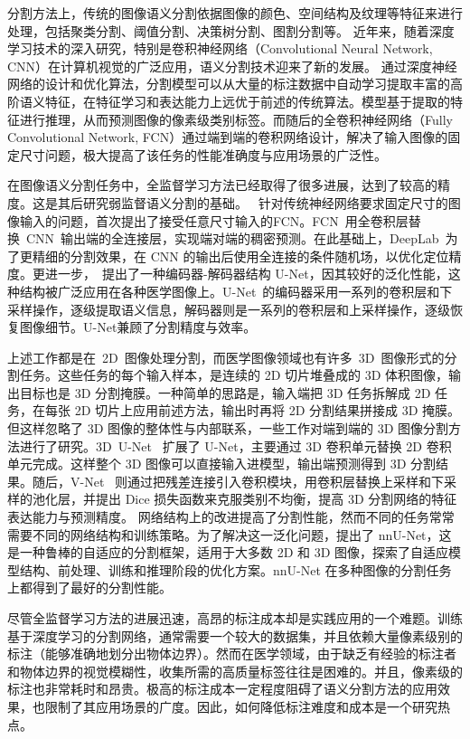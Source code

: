 分割方法上，传统的图像语义分割依据图像的颜色、空间结构及纹理等特征来进行处理，包括聚类分割\citep{coates2012learning}、阈值分割\citep{ying2005fast}、决策树分割\citep{shotton2008semantic}、图割分割\citep{vicente2008graph}等。
近年来，随着深度学习技术的深入研究，特别是卷积神经网络（Convolutional Neural Network, CNN）在计算机视觉的广泛应用，语义分割技术迎来了新的发展。
通过深度神经网络的设计和优化算法，分割模型可以从大量的标注数据中自动学习提取丰富的高阶语义特征，在特征学习和表达能力上远优于前述的传统算法。模型基于提取的特征进行推理，从而预测图像的像素级类别标签。而随后的全卷积神经网络（Fully Convolutional Network, FCN）通过端到端的卷积网络设计，解决了输入图像的固定尺寸问题，极大提高了该任务的性能准确度与应用场景的广泛性。%

在图像语义分割任务中，全监督学习方法已经取得了很多进展，达到了较高的精度。这是其后研究弱监督语义分割的基础。
\citet{long2015fully}~针对传统神经网络要求固定尺寸的图像输入的问题，首次提出了接受任意尺寸输入的FCN。FCN~用全卷积层替换~CNN~输出端的全连接层，实现端对端的稠密预测。在此基础上，DeepLab~为了更精细的分割效果，在 CNN 的输出后使用全连接的条件随机场，以优化定位精度。更进一步，\citet{ronneberger2015u}~提出了一种编码器-解码器结构 U-Net，因其较好的泛化性能，这种结构被广泛应用在各种医学图像上。U-Net~的编码器采用一系列的卷积层和下采样操作，逐级提取语义信息，解码器则是一系列的卷积层和上采样操作，逐级恢复图像细节。U-Net兼顾了分割精度与效率。

上述工作都是在~2D~图像处理分割，而医学图像领域也有许多~3D~图像形式的分割任务。这些任务的每个输入样本，是连续的 2D 切片堆叠成的 3D 体积图像，输出目标也是 3D 分割掩膜。一种简单的思路是，输入端把 3D 任务拆解成 2D 任务，在每张 2D 切片上应用前述方法，输出时再将 2D 分割结果拼接成 3D 掩膜。但这样忽略了 3D 图像的整体性与内部联系，一些工作对端到端的 3D 图像分割方法进行了研究。3D~U-Net~\citep{cciccek20163d} 扩展了 U-Net，主要通过 3D 卷积单元替换 2D 卷积单元完成。这样整个 3D 图像可以直接输入进模型，输出端预测得到 3D 分割结果。随后，V-Net~\citep{milletari2016v} 则通过把残差连接引入卷积模块，用卷积层替换上采样和下采样的池化层，并提出 Dice 损失函数来克服类别不均衡，提高 3D 分割网络的特征表达能力与预测精度。
网络结构上的改进提高了分割性能，然而不同的任务常常需要不同的网络结构和训练策略。为了解决这一泛化问题，\citet{isensee2019automated}提出了 nnU-Net，这是一种鲁棒的自适应的分割框架，适用于大多数 2D 和 3D 图像，探索了自适应模型结构、前处理、训练和推理阶段的优化方案。nnU-Net 在多种图像的分割任务上都得到了最好的分割性能。

尽管全监督学习方法的进展迅速，高昂的标注成本却是实践应用的一个难题。训练基于深度学习的分割网络，通常需要一个较大的数据集，并且依赖大量像素级别的标注（能够准确地划分出物体边界）。然而在医学领域，由于缺乏有经验的标注者和物体边界的视觉模糊性，收集所需的高质量标签往往是困难的。并且，像素级的标注也非常耗时和昂贵。极高的标注成本一定程度阻碍了语义分割方法的应用效果，也限制了其应用场景的广度。因此，如何降低标注难度和成本是一个研究热点。

